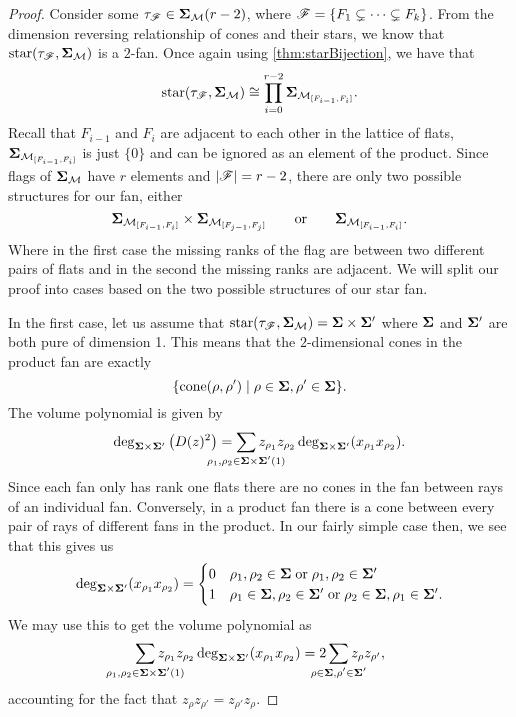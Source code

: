 \documentclass[12pt,oneside]{../../sfsuthesis}
\begin{document}
\begin{proof}
    Consider some \( \tau_{\mathscr{F}} \in {\bm{\Sigma}}_{\mathcal{M}}(r - 2) \), where \( \mathscr{F} = \{ F_1 \subsetneq \cdots \subsetneq F_{k} \} \).
    From the dimension reversing relationship of cones and their stars, we know that \( \operatorname{star}(\tau_{\mathscr{F}}, {\bm{\Sigma}}_{\mathcal{M}}) \) is a \( 2 \)-fan.
    Once again using \th\ref{thm:starBijection}, we have that
    \[
        \operatorname{star}(\tau_{\mathscr{F}}, {\bm{\Sigma}}_{\mathcal{M}}) \cong \prod_{i=0}^{r-2} {\bm{\Sigma}}_{\mathcal{M}_{[F_{i-1}, F_i]}}.
    \]
    Recall that \( F_{i-1} \) and \( F_i \) are adjacent to each other in the lattice of flats, \( {\bm{\Sigma}}_{\mathcal{M}_{[F_{i-1}, F_i]}} \) is just \( \{0\} \) and can be ignored as an element of the product.
    Since flags of \( {\bm{\Sigma}}_{\mathcal{M}} \) have \( r \) elements and \( |\mathscr{F}| = r - 2\), there are only two possible structures for our fan,
    either
    \[
        {\bm{\Sigma}}_{\mathcal{M}_{[F_{i-1}, F_i]}} \times {\bm{\Sigma}}_{\mathcal{M}_{[F_{j-1}, F_j]}}
        \quad \quad \text{or} \quad \quad
        {\bm{\Sigma}}_{\mathcal{M}_{[F_{i-1}, F_i]}}.
    \]
    Where in the first case the missing ranks of the flag are between two different pairs of flats and in the second the missing ranks are adjacent.
    We will split our proof into cases based on the two possible structures of our star fan.

    In the first case, let us assume that \( \operatorname{star}(\tau_{\mathscr{F}}, {\bm{\Sigma}}_{\mathcal{M}}) = {\bm{\Sigma}} \times {\bm{\Sigma}}' \) where  \( {\bm{\Sigma}} \) and  \( {\bm{\Sigma}}' \) are both pure of dimension 1.
    This means that the \( 2 \)-dimensional cones in the product fan are exactly
    \[
        \{ \mathrm{cone}(\rho, \rho') \; | \; \rho \in {\bm{\Sigma}}, \rho' \in {\bm{\Sigma}} \}.
    \]
    The volume polynomial is given by
    \[
        \deg_{\bSigma \times \bSigma'}\big(D(z)^2\big) = \sum_{\mathclap{\rho_1, \rho_2 \in \bSigma \times \bSigma'(1)}} z_{\rho_1}z_{\rho_2} \deg_{\bSigma \times \bSigma'}(x_{\rho_1}x_{\rho_2}).
    \]
    Since each fan only has rank one flats there are no cones in the fan between rays of an individual fan.
    Conversely, in a product fan there is a cone between every pair of rays of different fans in the product.
    In our fairly simple case then, we see that this gives us
    \[
        \deg_{{\bm{\Sigma}} \times {\bm{\Sigma}}'}(x_{\rho_1}x_{\rho_2}) =
        \begin{cases}
            0 & \rho_1, \rho_2 \in {\bm{\Sigma}}\; \text{or}\; \rho_1, \rho_2 \in {\bm{\Sigma}}'                           \\
            1 & \rho_1 \in {\bm{\Sigma}}, \rho_2 \in {\bm{\Sigma}}'\; \text{or}\; \rho_2 \in {\bm{\Sigma}}, \rho_1 \in {\bm{\Sigma}}'.
        \end{cases}
    \]
    We may use this to get the volume polynomial as
    \[
        \sum_{\mathclap{\rho_1, \rho_2 \in \bSigma \times \bSigma'(1)}} z_{\rho_1}z_{\rho_2} \deg_{\bSigma \times \bSigma'}(x_{\rho_1}x_{\rho_2})
        = 2\sum_{\mathclap{\rho \in \bSigma, \rho' \in \bSigma'}} z_{\rho}z_{\rho'},
    \]
    accounting for the fact that \( z_{\rho}z_{\rho'} = z_{\rho'}z_{\rho} \).


\end{proof}
\end{document}
